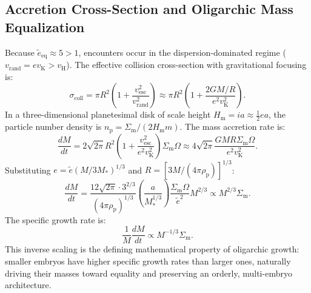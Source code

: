 \documentclass[11pt,a4paper]{article}
\begin{document}
\subsection{Accretion Cross-Section and Oligarchic Mass Equalization}
Because $\tilde{e}_{\text{eq}} \approx 5 > 1$, encounters occur in the dispersion-dominated regime ($v_{\text{rand}} = e v_{\text{K}} > v_{\text{H}}$). The effective collision cross-section with gravitational focusing is:
\begin{equation}
\sigma_{\text{coll}} = \pi R^2 \left( 1 + \frac{v_{\text{esc}}^2}{v_{\text{rand}}^2} \right) \approx \pi R^2 \left( 1 + \frac{2GM/R}{e^2 v_{\text{K}}^2} \right).
\end{equation}
In a three-dimensional planetesimal disk of scale height $H_{\text{m}} = i a \approx \frac{1}{2} e a$, the particle number density is $n_{\text{p}} = \Sigma_{\text{m}} / (2 H_{\text{m}} m)$. The mass accretion rate is:
\begin{equation}
\frac{dM}{dt} = 2 \sqrt{2\pi} R^2 \left( 1 + \frac{v_{\text{esc}}^2}{e^2 v_{\text{K}}^2} \right) \Sigma_{\text{m}} \Omega \approx 4 \sqrt{2\pi} \frac{G M R \Sigma_{\text{m}} \Omega}{e^2 v_{\text{K}}^2}.
\end{equation}
Substituting $e = \tilde{e} (M / 3M_*)^{1/3}$ and $R = [3M / (4\pi \rho_{\text{p}})]^{1/3}$:
\begin{equation}
\frac{dM}{dt} = \frac{12 \sqrt{2\pi} \cdot 3^{2/3}}{(4\pi \rho_{\text{p}})^{1/3}} \left( \frac{a}{M_*^{1/3}} \right) \frac{\Sigma_{\text{m}} \Omega}{\tilde{e}^2} M^{2/3} \propto M^{2/3} \Sigma_{\text{m}}.
\end{equation}
The specific growth rate is:
\begin{equation}
\frac{1}{M}\frac{dM}{dt} \propto M^{-1/3} \Sigma_{\text{m}}.
\end{equation}
This inverse scaling is the defining mathematical property of oligarchic growth: smaller embryos have higher specific growth rates than larger ones, naturally driving their masses toward equality and preserving an orderly, multi-embryo architecture.
\end{document}
